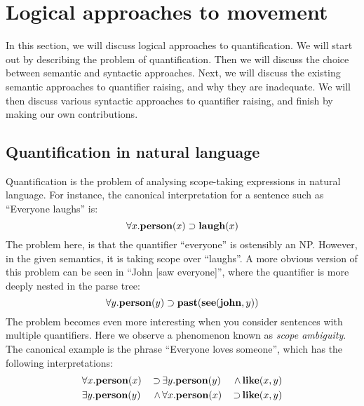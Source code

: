 \section{Logical approaches to movement}%
\label{sec:movement-and-quantifier-raising}
In this section, we will discuss logical approaches to
quantification. We will start out by describing the problem of
quantification. Then we will discuss the choice between semantic and
syntactic approaches. Next, we will discuss the existing semantic
approaches to quantifier raising, and why they are inadequate. We will
then discuss various syntactic approaches to quantifier raising, and
finish by making our own contributions.

\subsection{Quantification in natural language}
Quantification is the problem of analysing scope-taking expressions in
natural language. For instance, the canonical interpretation for a
sentence such as ``Everyone laughs'' is:
\[
  \forall{x}.\mathbf{person}(x)\supset\mathbf{laugh}(x)
\]
The problem here, is that the quantifier ``everyone'' is ostensibly an
NP. However, in the given semantics, it is taking scope over
``laughs''. A more obvious version of this problem can be seen in
``John [saw everyone]'', where the quantifier is more deeply nested in
the parse tree:
\[
  \forall{y}.\mathbf{person}(y)\supset\mathbf{past}(\mathbf{see}(\mathbf{john},y))
\]
The problem becomes even more interesting when you consider sentences
with multiple quantifiers. Here we observe a phenomenon known as
\emph{scope ambiguity}. The canonical example is the phrase ``Everyone
loves someone'', which has the following interpretations:
\begin{alignat*}{3}
  &\forall x.\mathbf{person}(x) \,&\supset \,&\exists y.\mathbf{person}(y) \,&\wedge  \,&\mathbf{like}(x,y)\\
  &\exists y.\mathbf{person}(y) \,&\wedge  \,&\forall x.\mathbf{person}(x) \,&\supset \,&\mathbf{like}(x,y)
\end{alignat*}

